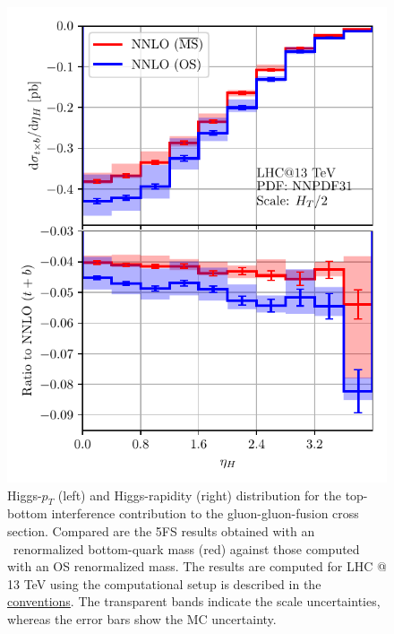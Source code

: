 \begin{figure}[ht]
\begin{minipage}[t]{0.49\textwidth}
  \includegraphics[width=\textwidth]{Images/yH_MS_OS_comparison_13000.pdf}
\end{minipage}
\caption{Higgs-$p_T$ (left) and Higgs-rapidity (right) distribution for the top-bottom interference contribution to the gluon-gluon-fusion cross section. Compared are the 5\acs{FS} results obtained with an \MS\ renormalized bottom-quark mass (red) against those computed with an \acs{OS} renormalized mass. The results are computed for LHC @ 13 TeV using the computational setup is described in the \hyperref[chap:notation_and_conventions]{conventions}. The transparent bands indicate the scale uncertainties, whereas the error bars show the \acs{MC} uncertainty.}
\label{fig:6:pT_yH_OS_MS_comparison}
\end{figure}
%
